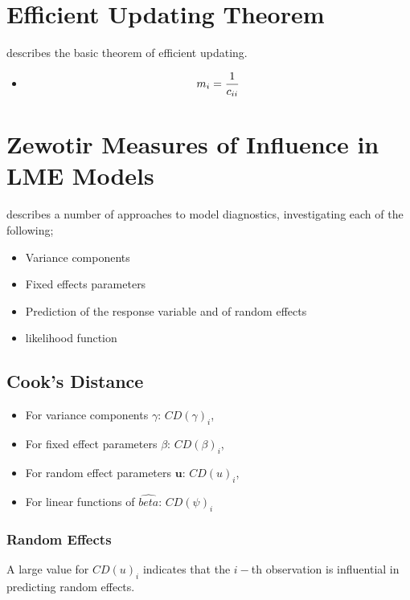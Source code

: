 \documentclass[12pt, a4paper]{report}
\theoremstyle{plain}
\theoremstyle{definition}
\theoremstyle{remark}
\begin{document}
\section{Efficient Updating Theorem} %
\citet{Zewotir} describes the basic theorem of efficient updating.
\begin{itemize}
\item \[ m_i = {1 \over c_{ii}}\]
\end{itemize}
\section{Zewotir Measures of Influence in LME Models}%
\citet{Zewotir} describes a number of approaches to model diagnostics, investigating each of the following;
\begin{itemize}
\item Variance components
\item Fixed effects parameters
\item Prediction of the response variable and of random effects
\item likelihood function
\end{itemize}


\subsection{Cook's Distance}
\begin{itemize}
\item For variance components $\gamma$: $CD(\gamma)_i$,
\item For fixed effect parameters $\beta$: $CD(\beta)_i$,
\item For random effect parameters $\boldsymbol{u}$: $CD(u)_i$,
\item For linear functions of $\hat{beta}$: $CD(\psi)_i$
\end{itemize}


\newpage
\subsubsection{Random Effects}


A large value for $CD(u)_i$ indicates that the $i-$th observation is influential in predicting random effects.
\end{document}
